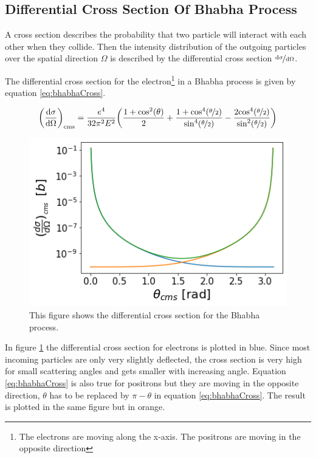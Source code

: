 \documentclass[a4paper,11pt,twosided,final,german,openbib,pdftex,listof=totoc,bibliography=totoc]{scrbook}
\begin{document}
\subsection{Differential Cross Section Of Bhabha Process}
\label{sec:cross-section}

A cross section describes the probability that two particle will interact with each other when they collide. Then the intensity distribution of the outgoing particles over the spatial direction $\Omega$ is described by the differential cross section $\nicefrac{\textrm{d}\sigma}{\textrm{d}\Omega}$.

The differential cross section for the electron\footnote{The electrons are moving along the x-axis. The positrons are moving in the opposite direction} in a Bhabha process is given by equation \ref{eq:bhabhaCross}. 

\begin{equation}
	\bigg(\frac{\textrm{d}\sigma}{\textrm{d}\Omega} \bigg)_{\textrm{cms}} = \frac{e^4}{32\pi^2 E^2}
	\bigg(
	\frac{1+\textrm{cos}^2(\theta)}{2} +
 \frac{1+\textrm{cos}^4(\nicefrac{\theta}{2})}{\textrm{sin}^4(\nicefrac{\theta}{2})} - \frac{2\textrm{cos}^4(\nicefrac{\theta}{2})}{\textrm{sin}^2(\nicefrac{\theta}{2})}   \bigg)
 \label{eq:bhabhaCross}
\end{equation}


\begin{figure}[h!]
	\centering
	\includegraphics[width=12cm]{Bilder/finalCross}
	\caption[Differential Cross Section For The Bhabha Process]{This figure shows the differential cross section for the Bhabha process.}
	\label{fig:CrossSectionBoth}
\end{figure}



In figure \ref{fig:CrossSectionBoth} the differential cross section for electrons is plotted in blue. Since most incoming particles are only very slightly deflected, the cross section is very high for small scattering angles and gets smaller with increasing angle. Equation \ref{eq:bhabhaCross} is also true for positrons but they are moving in the opposite direction, $\theta$ has to be replaced by $\pi - \theta$ in equation \ref{eq:bhabhaCross}. The result is plotted in the same figure but in orange.
\end{document}
